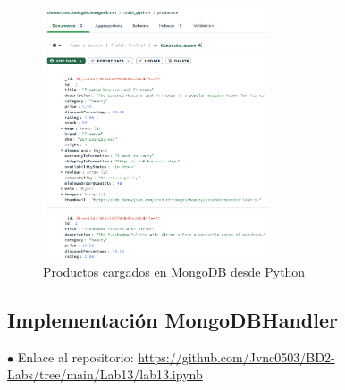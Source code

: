 \begin{figure}[H]
    \centering
    \includegraphics[width=0.6\textwidth]{./p2_productos.png}
    \caption{Productos cargados en MongoDB desde Python}\label{fig:pythonproductos}
\end{figure}

\subsection{Implementación MongoDBHandler}\label{repo}

$\bullet$ Enlace al repositorio: \url{https://github.com/Jvnc0503/BD2-Labs/tree/main/Lab13/lab13.ipynb}